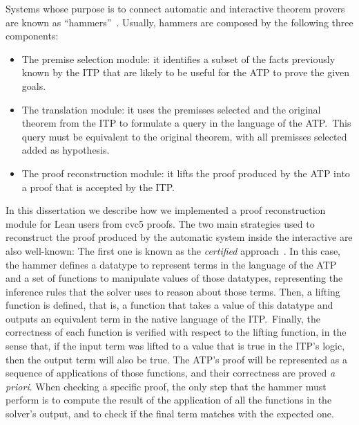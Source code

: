 \label{sec:hammering}
Systems whose purpose is to connect automatic and interactive
theorem provers are known as ``hammers''~\cite{hammering}.
Usually, hammers are composed by the following three components:

\begin{itemize}
  \item The premise selection module: it identifies
        a subset of the facts previously known by the
        ITP that are likely to be useful for the ATP to
        prove the given goals.\@
  \item The translation module: it uses the premisses selected and the original
        theorem from the ITP to formulate a query in the language of the ATP.\ This query
        must be equivalent to the original theorem, with all premisses selected
        added as hypothesis.
  \item The proof reconstruction module: it lifts the proof produced
        by the ATP into a proof that is accepted by the ITP.\@
\end{itemize}

In this dissertation we describe how we implemented a proof reconstruction module
for Lean users from cvc5 proofs.
The two main strategies used to reconstruct the proof produced
by the automatic system inside the interactive are also well-known:
The first one is known as the \textit{certified} approach~\cite{snipe}. In this case,
the hammer defines a datatype to represent
terms in the language of the ATP and a set of functions to manipulate
values of those datatypes, representing
the inference rules that the solver uses to reason about those terms. Then, a lifting function is defined, that is,
a function that takes a value of this datatype and outputs an equivalent term in the native
language of the ITP.\ Finally, the correctness of each function is
verified with respect to the lifting function, in the sense that, if the input term
was lifted to a value that is true in the ITP's logic, then the output term will
also be true. The ATP's proof will be represented as a sequence of applications of those
functions, and their correctness are proved \textit{a priori}. When checking
a specific proof, the only step that the hammer must perform is to compute the result
of the application of all the functions in the solver's output, and to check if
the final term matches with the expected one.

